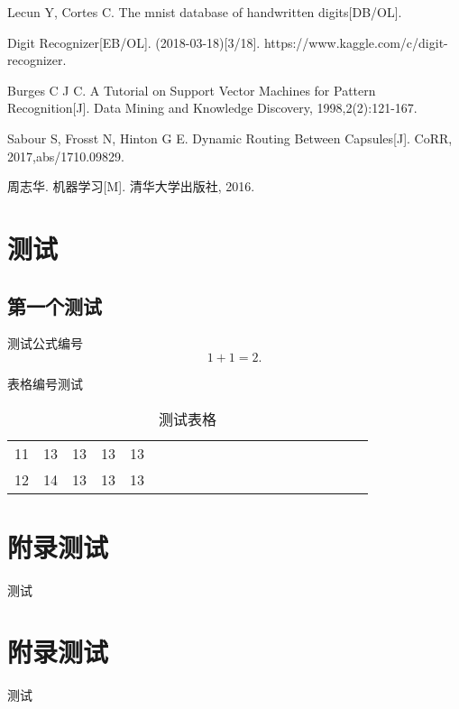 \documentclass[forprint]{WHUBachelor}
\begin{document}

\cleardoublepage{}
{}
\begin{thebibliography}{00}

   Lecun Y, Cortes C. The mnist database of handwritten digits[DB/OL]. 

   Digit Recognizer[EB/OL]. (2018-03-18)[3/18]. https://www.kaggle.com/c/digit-recognizer.

   Burges C J C. A Tutorial on Support Vector Machines for Pattern Recognition[J]. Data Mining and Knowledge Discovery, 1998,2(2):121-167.

   Sabour S, Frosst N, Hinton G E. Dynamic Routing Between Capsules[J]. CoRR, 2017,abs/1710.09829.

   周志华. 机器学习[M]. 清华大学出版社, 2016.
\end{thebibliography}


\appendix

\chapter{测试}

\section{第一个测试}
测试公式编号
\begin{equation}
1+1=2.
\end{equation}

表格编号测试

\begin{table}[h]
  \centering
  \caption{测试表格}
  \begin{tabular}{*{20}c}
     \hline
     11 & 13  & 13  & 13  & 13 \\
     12 & 14  & 13  & 13  & 13 \\
     \hline
   \end{tabular}
\end{table}


\chapter{附录测试}

测试

\chapter{附录测试}

测试

\cleardoublepage
\end{document}
